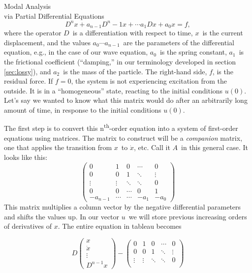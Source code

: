 \documentclass[a4paper,10pt]{report}
\numberwithin{equation}{section}
\begin{document}
{\begin{chapter}
\begin{section}{Modal Analysis \\via Partial Differential Equations}
\begin{equation}
D^n x + a_{n-1} D^n-1 x + \cdots a_1 Dx + a_0 x = f ,
\end{equation}
where the operator $D$\  is a differentiation with respect to time, $x$\  is the current displacement, and the values $a_0 \cdots a_{n-1}$\  are the parameters of the differential equation, e.g., in the case of our wave equation, $a_0$\  is the spring constant, $a_1$\  is the frictional coefficient (``damping,'' in our terminology developed in section \ref{sec:lossy}), and $a_2$\  is the mass of the particle. The right-hand side, $f$, is the residual force. If $f=0$, the system is not experiencing excitation from the outside. It is in a ``homogeneous'' state, reacting to the initial conditions $u(0)$. Let's say we wanted to know what this matrix would do after an arbitrarily long amount of time, in response to the initial conditions $u(0)$. 
\par
The first step is to convert this n\textsuperscript{th}-order equation into a system of first-order equations using matrices. The matrix to construct will be a \emph{companion} matrix, one that applies the transition from $x$\  to $\dot{x}$, etc. Call it $A$\  in this general case. It looks like this:
\begin{equation}
\begin{pmatrix}
0 &1 &0 &\cdots &0\\
0 &0 &1 &\ddots &\vdots\\
\vdots &\vdots &\ddots &\ddots &0\\
0 &0 &\cdots &0 &1\\
-a_{n-1} &\cdots &\cdots &-a_1 &-a_0
\end{pmatrix}
\end{equation}
This matrix multiplies a column vector by the negative differential parameters and shifts the values up. In our vector $u$\  we will store previous increasing orders of derivatives of $x$. The entire equation in tableau becomes\cite[p.~17]{Reid1992}
\par
\begin{equation}
 D \begin{pmatrix}
      x\\
      \dot{x}\\
      \vdots\\
      D^{n-1}x
     \end{pmatrix}
-
\begin{pmatrix}
0 &1 &0 &\cdots &0\\
0 &0 &1 &\ddots &\vdots\\
\vdots &\vdots &\ddots &\ddots &0\\

\end{pmatrix}
\end{equation}
\end{section}
\end{chapter}}
\end{document}
